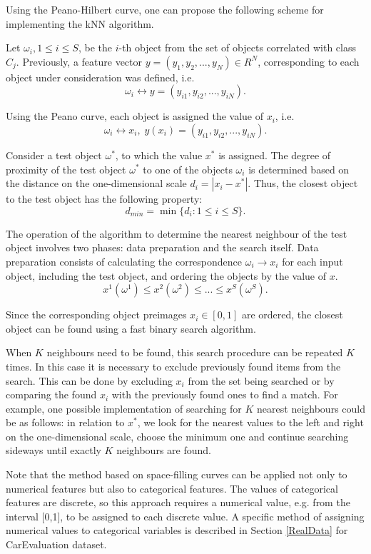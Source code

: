 \documentclass[entropy,article,submit,moreauthors,pdftex]{Definitions/mdpi}
\begin{document}
Using the Peano-Hilbert curve, one can propose the following scheme for implementing the kNN algorithm.

Let $\omega_i, 1 \leq i \leq S$, be the $i$-th object from the set of objects correlated with class $C_j$. Previously, a feature vector $y = (y_1, y_2, ..., y_N) \in R^N$, corresponding to each object under consideration was defined, i.e. 
\[
\omega_i \leftrightarrow y = (y_{i1}, y_{i2}, ..., y_{iN}).
\] 

Using the Peano curve, each object is assigned the value of $x_i$, i.e.
\[
\omega_i \leftrightarrow x_i, \; y(x_i) = (y_{i1}, y_{i2}, ..., y_{iN}).
\] 

Consider a test object $\omega^*$, to which the value $x^*$ is assigned. The degree of proximity of the test object $\omega^*$ to one of the objects $\omega_i$ is determined based on the distance on the one-dimensional scale $d_i = |x_i - x^* |$.
Thus, the closest object to the test object has the following property:
\[
d_{min} = \min \{ d_i: 1 \leq i \leq S \}.
\] 

The operation of the algorithm to determine the nearest neighbour of the test object involves two phases: data preparation and the search itself. Data preparation consists of calculating the correspondence $\omega_i \rightarrow x_i$ for each input object, including the test object, and ordering the objects by the value of $x$.
\[
x^1(\omega^1) \leq x^2(\omega^2) \leq ... \leq x^S(\omega^S).
\] 

Since the corresponding object preimages $x_i \in [0,1]$ are ordered, the closest object can be found using a fast binary search algorithm.

When $K$ neighbours need to be found, this search procedure can be repeated $K$ times. In this case it is necessary to exclude previously found items from the search. This can be done by excluding $x_i$ from the set being searched or by comparing the found $x_i$ with the previously found ones to find a match. For example, one possible implementation of searching for $K$ nearest neighbours could be as follows: in relation to $x^*$, we look for the nearest values to the left and right on the one-dimensional scale, choose the minimum one and continue searching sideways until exactly $K$ neighbours are found.

\textcolor[rgb]{1,0,0}{Note that the method based on space-filling curves can be applied not only to numerical features but also to categorical features. The values of categorical features are discrete, so this approach requires a numerical value, e.g. from the interval [0,1], to be assigned to each discrete value.
A specific method of assigning numerical values to categorical variables is described in Section \ref{RealData} for CarEvaluation dataset.
}%
\end{document}

